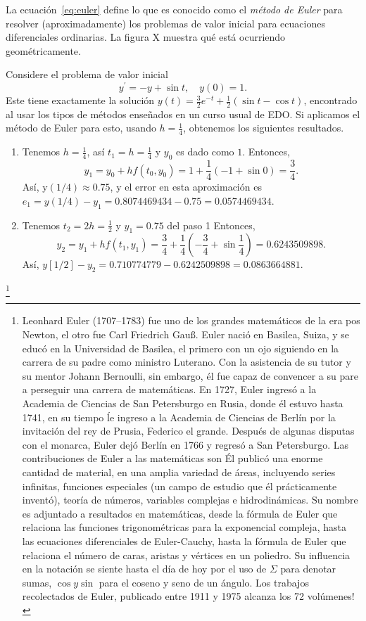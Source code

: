 La ecuación~\eqref{eq:euler} define lo que es conocido como el \emph{método de Euler} para resolver (aproximadamente) los problemas de valor inicial para ecuaciones diferenciales ordinarias. La figura X muestra qué está ocurriendo geométricamente.

\begin{example}
	Considere el problema de valor inicial \[ y^{\prime}=-y+\sin t,\quad y\left(0\right)=1. \]
	Este tiene exactamente la solución $y\left(t\right)=\frac{3}{2}e^{-t}+\frac{1}{2}\left(\sin t-\cos t\right)$, encontrado al usar los tipos de métodos enseñados en un curso usual de EDO. Si aplicamos el método de Euler para esto, usando $h=\frac{1}{4}$, obtenemos los siguientes resultados.
	\begin{enumerate}[Paso 1]
		\item Tenemos $h=\frac{1}{4}$, así $t_{1}=h=\frac{1}{4}$ y $y_{0}$ es dado como $1$. Entonces, \[ y_{1}=y_{0}+hf\left(t_{0},y_{0}\right)=1+\frac{1}{4}\left(-1+\sin 0\right)=\frac{3}{4}. \] Así, y$\left(1/4\right)\approx0.75$, y el error en esta aproximación es $e_{1}=y\left(1/4\right)-y_{1}=0.8074469434-0.75=0.0574469434$.
		\item Tenemos $t_{2}=2h=\frac{1}{2}$ y $y_{1}=0.75$ del paso 1%
		Entonces, \[ y_{2}=y_{1}+hf\left(t_{1},y_{1}\right)=\frac{3}{4}+\frac{1}{4}\left(-\frac{3}{4}+\sin\frac{1}{4}\right)=0.6243509898. \] Así, $y\left[1/2\right]-y_{2}=0.710774779-0.6242509898=0.0863664881$.
	\end{enumerate}
\end{example}\footnote{Leonhard Euler (1707--1783) fue uno de los grandes matemáticos de la era pos Newton, el otro fue Carl Friedrich Gauß. Euler nació en Basilea, Suiza, y se educó en la Universidad de Basilea, el primero con un ojo siguiendo en la carrera de su padre como ministro Luterano. Con la asistencia de su tutor y su mentor Johann Bernoulli, sin embargo, él fue capaz de convencer a su pare a perseguir una carrera de matemáticas. En 1727, Euler ingresó a la Academia de Ciencias de San Petersburgo en Rusia, donde él estuvo hasta 1741, en su tiempo ĺe ingreso a la Academia de Ciencias de Berlín por la invitación del rey de Prusia, Federico el grande. Después de algunas disputas con el monarca, Euler dejó Berlín en 1766 y regresó a San Petersburgo. Las contribuciones de Euler a las matemáticas son %
Él publicó una enorme cantidad de material, en una amplia variedad de áreas, incluyendo series infinitas, funciones especiales (un campo de estudio que él prácticamente inventó), teoría de números, variables complejas e hidrodinámicas. Su nombre es adjuntado a resultados%
en matemáticas, desde la fórmula de Euler que relaciona las funciones trigonométricas para la exponencial compleja, hasta las ecuaciones diferenciales de Euler-Cauchy, hasta la fórmula de Euler que relaciona el número de caras, aristas y vértices en un poliedro. Su influencia en la notación se siente hasta el día de hoy por el uso de $\Sigma$ para denotar sumas, $\cos y $$\sin$ para el coseno y seno de un ángulo. Los trabajos recolectados de Euler, publicado entre 1911 y 1975 alcanza los 72 volúmenes!

}

